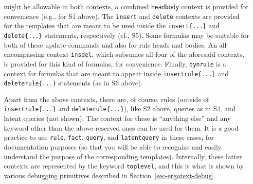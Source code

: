 might be allowable in both contexts, a combined \texttt{headbody} context
is provided for convenience (e.g., for S1 above).  The \texttt{insert} and
\texttt{delete} contexts are provided for the templates that are meant to
be used
inside the \texttt{insert\{...\}} and \texttt{delete\{...\}} statements,
respectively (cf., S5). Some formulas may be suitable for both of these
update commands and also for rule heads and bodies. An
all-encompassing context \texttt{insdel}, which subsumes all four of the
aforesaid contexts, is provided for this kind of
formulas, for convenience.  Finally, \texttt{dynrule} is a context for
formulas that are meant to appear inside \texttt{insertrule\{...\}}
and \texttt{deleterule\{...\}} statements (as in S6 above).

Apart from the above contexts, there are, of course, rules (outside of
\texttt{insertrule\{...\}} and \texttt{deleterule\{...\}}), like 
S2 above, queries as in S4, and latent queries (not shown). The context for
these is ``anything else'' and any keyword other than the above reserved
ones can be used for them. It is a good practice to use \texttt{rule}, \texttt{fact},
\texttt{query}, and \texttt{latentquery} in these cases, for documentation
purposes (so that you will be able to recognize and easily understand
the purpose of the corresponding templates). Internally, these latter contexts are represented by the keyword
\texttt{toplevel}, and this is what is shown by various debugging
primitives described in Section~\ref{sec-ergotext-debug}. 


